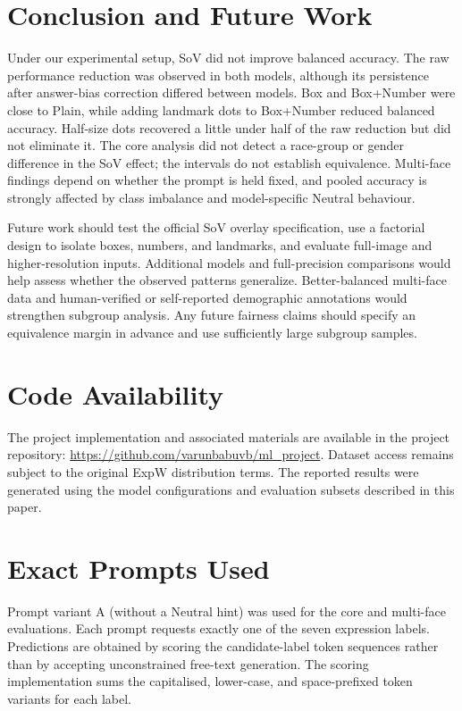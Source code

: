\documentclass[lettersize,journal]{IEEEtran}
\begin{document}
\section{Conclusion and Future Work}
Under our experimental setup, SoV did not improve balanced accuracy. The raw performance reduction was observed in both models, although its persistence after answer-bias correction differed between models. Box and Box+Number were close to Plain, while adding landmark dots to Box+Number reduced balanced accuracy. Half-size dots recovered a little under half of the raw reduction but did not eliminate it. The core analysis did not detect a race-group or gender difference in the SoV effect; the intervals do not establish equivalence. Multi-face findings depend on whether the prompt is held fixed, and pooled accuracy is strongly affected by class imbalance and model-specific Neutral behaviour.

Future work should test the official SoV overlay specification, use a factorial design to isolate boxes, numbers, and landmarks, and evaluate full-image and higher-resolution inputs. Additional models and full-precision comparisons would help assess whether the observed patterns generalize. Better-balanced multi-face data and human-verified or self-reported demographic annotations would strengthen subgroup analysis. Any future fairness claims should specify an equivalence margin in advance and use sufficiently large subgroup samples.

\section{Code Availability}
The project implementation and associated materials are available in the project repository:
\url{https://github.com/varunbabuvb/ml_project}. Dataset access remains subject to the original ExpW distribution terms. The reported results were generated using the model configurations and evaluation subsets described in this paper.


\appendices

\section{Exact Prompts Used}
\label{app:prompts}
Prompt variant A (without a Neutral hint) was used for the core and multi-face evaluations. Each prompt requests exactly one of the seven expression labels. Predictions are obtained by scoring the candidate-label token sequences rather than by accepting unconstrained free-text generation. The scoring implementation sums the capitalised, lower-case, and space-prefixed token variants for each label.
\end{document}
